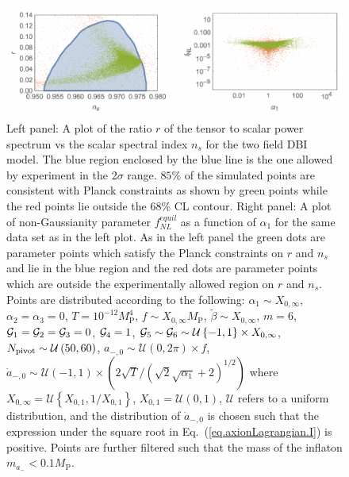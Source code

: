 \documentclass[a4paper,11pt]{article}
\begin{document}
  \begin{figure}
    \centering
    \includegraphics[width=1.0\textwidth]{figs/fig1.pdf}
    \caption{Left panel: A plot of the ratio $r$ of the tensor to scalar power spectrum vs the
      scalar spectral index $n_s$ for the two field DBI model.
      The blue region enclosed by the blue line is the one allowed by experiment in the 2$\sigma$
      range. $85\%$ of the simulated points are consistent with Planck constraints as shown by green
      points while the red points lie outside the 68\% CL contour.
          Right panel: A plot of non-Gaussianity parameter $f^{equil}_{NL}$ as
      a function of $\alpha_1$ for the same data set as in the left plot. As in the left panel
      the green dots are parameter points which satisfy the Planck constraints
      on $r$ and $n_s$ and lie in the blue region and the red dots are parameter points which are
      outside the experimentally allowed region on $r$ and $n_s$.
          Points are distributed according to the following:
      $\alpha_1 \sim X_{0, \infty}$, $\alpha_2 = \alpha_3 = 0$,
      $T = 10^{-12} M_\text{P}^4$,
      $f \sim X_{0, \infty} M_\text{P}$,
      $\tilde\beta \sim X_{0, \infty}$,
      $m = 6$, %
      ${\cal{G}}_1 = {\cal{G}}_2 = {\cal{G}}_3 = 0$, ${\cal{G}}_4 = 1$,
      ${\cal{G}}_5 \sim {\cal{G}}_6 \sim \mathcal{U}\left\{-1, 1\right\} \times X_{0, \infty}$,
      $N_{\rm pivot} \sim \mathcal{U}\left(50, 60\right)$,
      $a_{-, 0} \sim \mathcal{U}\left(0, 2\pi\right) \times f$,
      $\dot a_{-, 0} \sim \mathcal{U}\left(-1, 1\right)
          \times \left(2 \sqrt{T}/\left(\sqrt{2} \sqrt{\alpha_1} + 2\right)^{1/2}\right)$
      where $X_{0, \infty} = \mathcal{U}\left\{X_{0, 1}, 1 / X_{0, 1}\right\}$,
      $X_{0, 1} = \mathcal{U}\left(0, 1\right)$, $\mathcal{U}$ refers to a uniform distribution,
      and the distribution of $\dot a_{-, 0}$ is chosen such that the expression under the
      square root in Eq.~(\ref{eq.axionLagrangian.I}) is positive.
      Points are further filtered such that the mass of the inflaton $m_{a_-} < 0.1 M_\text{P}$.}
    \label{fig1}
  \end{figure}
\end{document}
